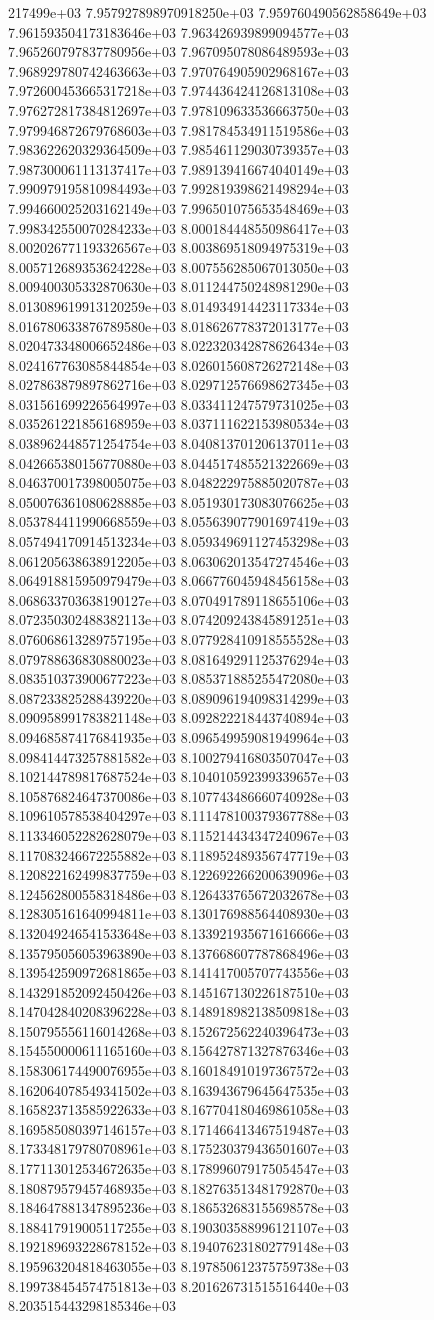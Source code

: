 217499e+03	7.957927898970918250e+03	7.959760490562858649e+03	7.961593504173183646e+03	7.963426939899094577e+03	7.965260797837780956e+03	7.967095078086489593e+03	7.968929780742463663e+03	7.970764905902968167e+03	7.972600453665317218e+03	7.974436424126813108e+03	7.976272817384812697e+03	7.978109633536663750e+03	7.979946872679768603e+03	7.981784534911519586e+03	7.983622620329364509e+03	7.985461129030739357e+03	7.987300061113137417e+03	7.989139416674040149e+03	7.990979195810984493e+03	7.992819398621498294e+03	7.994660025203162149e+03	7.996501075653548469e+03	7.998342550070284233e+03	8.000184448550986417e+03	8.002026771193326567e+03	8.003869518094975319e+03	8.005712689353624228e+03	8.007556285067013050e+03	8.009400305332870630e+03	8.011244750248981290e+03	8.013089619913120259e+03	8.014934914423117334e+03	8.016780633876789580e+03	8.018626778372013177e+03	8.020473348006652486e+03	8.022320342878626434e+03	8.024167763085844854e+03	8.026015608726272148e+03	8.027863879897862716e+03	8.029712576698627345e+03	8.031561699226564997e+03	8.033411247579731025e+03	8.035261221856168959e+03	8.037111622153980534e+03	8.038962448571254754e+03	8.040813701206137011e+03	8.042665380156770880e+03	8.044517485521322669e+03	8.046370017398005075e+03	8.048222975885020787e+03	8.050076361080628885e+03	8.051930173083076625e+03	8.053784411990668559e+03	8.055639077901697419e+03	8.057494170914513234e+03	8.059349691127453298e+03	8.061205638638912205e+03	8.063062013547274546e+03	8.064918815950979479e+03	8.066776045948456158e+03	8.068633703638190127e+03	8.070491789118655106e+03	8.072350302488382113e+03	8.074209243845891251e+03	8.076068613289757195e+03	8.077928410918555528e+03	8.079788636830880023e+03	8.081649291125376294e+03	8.083510373900677223e+03	8.085371885255472080e+03	8.087233825288439220e+03	8.089096194098314299e+03	8.090958991783821148e+03	8.092822218443740894e+03	8.094685874176841935e+03	8.096549959081949964e+03	8.098414473257881582e+03	8.100279416803507047e+03	8.102144789817687524e+03	8.104010592399339657e+03	8.105876824647370086e+03	8.107743486660740928e+03	8.109610578538404297e+03	8.111478100379367788e+03	8.113346052282628079e+03	8.115214434347240967e+03	8.117083246672255882e+03	8.118952489356747719e+03	8.120822162499837759e+03	8.122692266200639096e+03	8.124562800558318486e+03	8.126433765672032678e+03	8.128305161640994811e+03	8.130176988564408930e+03	8.132049246541533648e+03	8.133921935671616666e+03	8.135795056053963890e+03	8.137668607787868496e+03	8.139542590972681865e+03	8.141417005707743556e+03	8.143291852092450426e+03	8.145167130226187510e+03	8.147042840208396228e+03	8.148918982138509818e+03	8.150795556116014268e+03	8.152672562240396473e+03	8.154550000611165160e+03	8.156427871327876346e+03	8.158306174490076955e+03	8.160184910197367572e+03	8.162064078549341502e+03	8.163943679645647535e+03	8.165823713585922633e+03	8.167704180469861058e+03	8.169585080397146157e+03	8.171466413467519487e+03	8.173348179780708961e+03	8.175230379436501607e+03	8.177113012534672635e+03	8.178996079175054547e+03	8.180879579457468935e+03	8.182763513481792870e+03	8.184647881347895236e+03	8.186532683155698578e+03	8.188417919005117255e+03	8.190303588996121107e+03	8.192189693228678152e+03	8.194076231802779148e+03	8.195963204818463055e+03	8.197850612375759738e+03	8.199738454574751813e+03	8.201626731515516440e+03	8.203515443298185346e+03	